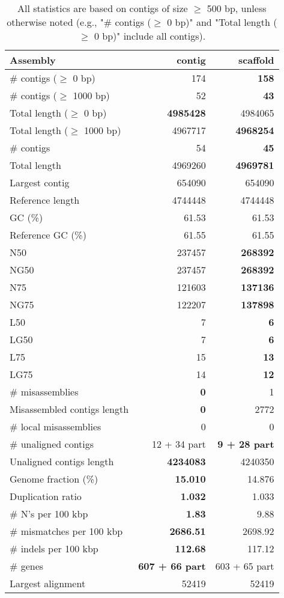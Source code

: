\documentclass[12pt,a4paper]{article}
\begin{document}
\begin{table}[ht]
\begin{center}
\caption{All statistics are based on contigs of size $\geq$ 500 bp, unless otherwise noted (e.g., "\# contigs ($\geq$ 0 bp)" and "Total length ($\geq$ 0 bp)" include all contigs).}
\begin{tabular}{|l*{2}{|r}|}
\hline
Assembly & contig & scaffold \\ \hline
\# contigs ($\geq$ 0 bp) & 174 & {\bf 158} \\ \hline
\# contigs ($\geq$ 1000 bp) & 52 & {\bf 43} \\ \hline
Total length ($\geq$ 0 bp) & {\bf 4985428} & 4984065 \\ \hline
Total length ($\geq$ 1000 bp) & 4967717 & {\bf 4968254} \\ \hline
\# contigs & 54 & {\bf 45} \\ \hline
Total length & 4969260 & {\bf 4969781} \\ \hline
Largest contig & 654090 & 654090 \\ \hline
Reference length & 4744448 & 4744448 \\ \hline
GC (\%) & 61.53 & 61.53 \\ \hline
Reference GC (\%) & 61.55 & 61.55 \\ \hline
N50 & 237457 & {\bf 268392} \\ \hline
NG50 & 237457 & {\bf 268392} \\ \hline
N75 & 121603 & {\bf 137136} \\ \hline
NG75 & 122207 & {\bf 137898} \\ \hline
L50 & 7 & {\bf 6} \\ \hline
LG50 & 7 & {\bf 6} \\ \hline
L75 & 15 & {\bf 13} \\ \hline
LG75 & 14 & {\bf 12} \\ \hline
\# misassemblies & {\bf 0} & 1 \\ \hline
Misassembled contigs length & {\bf 0} & 2772 \\ \hline
\# local misassemblies & 0 & 0 \\ \hline
\# unaligned contigs & 12 + 34 part & {\bf 9 + 28 part} \\ \hline
Unaligned contigs length & {\bf 4234083} & 4240350 \\ \hline
Genome fraction (\%) & {\bf 15.010} & 14.876 \\ \hline
Duplication ratio & {\bf 1.032} & 1.033 \\ \hline
\# N's per 100 kbp & {\bf 1.83} & 9.88 \\ \hline
\# mismatches per 100 kbp & {\bf 2686.51} & 2698.92 \\ \hline
\# indels per 100 kbp & {\bf 112.68} & 117.12 \\ \hline
\# genes & {\bf 607 + 66 part} & 603 + 65 part \\ \hline
Largest alignment & 52419 & 52419 \\ \hline
\end{tabular}
\end{center}
\end{table}
\end{document}
